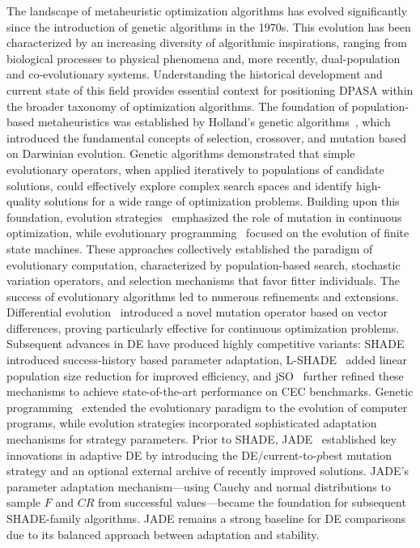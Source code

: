 \documentclass[11pt]{article}
\begin{document}
The landscape of metaheuristic optimization algorithms has evolved significantly since the introduction of genetic algorithms in the 1970s. This evolution has been characterized by an increasing diversity of algorithmic inspirations, ranging from biological processes to physical phenomena and, more recently, dual-population and co-evolutionary systems. Understanding the historical development and current state of this field provides essential context for positioning DPASA within the broader taxonomy of optimization algorithms.
The foundation of population-based metaheuristics was established by Holland's genetic algorithms~\citep{holland1992adaptation}, which introduced the fundamental concepts of selection, crossover, and mutation based on Darwinian evolution. Genetic algorithms demonstrated that simple evolutionary operators, when applied iteratively to populations of candidate solutions, could effectively explore complex search spaces and identify high-quality solutions for a wide range of optimization problems.
Building upon this foundation, evolution strategies~\citep{rechenberg1973evolutionsstrategie} emphasized the role of mutation in continuous optimization, while evolutionary programming~\citep{fogel1966artificial} focused on the evolution of finite state machines. These approaches collectively established the paradigm of evolutionary computation, characterized by population-based search, stochastic variation operators, and selection mechanisms that favor fitter individuals.
The success of evolutionary algorithms led to numerous refinements and extensions. Differential evolution~\citep{storn1997differential} introduced a novel mutation operator based on vector differences, proving particularly effective for continuous optimization problems. Subsequent advances in DE have produced highly competitive variants: SHADE~\citep{tanabe2013shade} introduced success-history based parameter adaptation, L-SHADE~\citep{tanabe2014lshade} added linear population size reduction for improved efficiency, and jSO~\citep{brest2017jso} further refined these mechanisms to achieve state-of-the-art performance on CEC benchmarks. Genetic programming~\citep{koza1992genetic} extended the evolutionary paradigm to the evolution of computer programs, while evolution strategies incorporated sophisticated adaptation mechanisms for strategy parameters.
Prior to SHADE, JADE~\citep{zhang2009jade} established key innovations in adaptive DE by introducing the DE/current-to-$p$best mutation strategy and an optional external archive of recently improved solutions. JADE's parameter adaptation mechanism---using Cauchy and normal distributions to sample $F$ and $CR$ from successful values---became the foundation for subsequent SHADE-family algorithms. JADE remains a strong baseline for DE comparisons due to its balanced approach between adaptation and stability.
\end{document}
